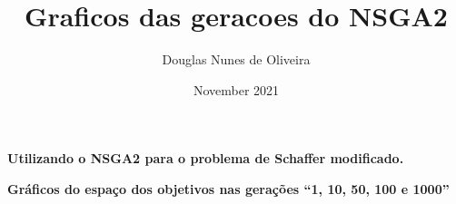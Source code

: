 \documentclass[11pt, a4paper]{report}
\title{Graficos das geracoes do NSGA2}
\author{Douglas Nunes de Oliveira}
\date{November 2021}
\begin{document}
    \begin{center}
        \textbf{Utilizando o NSGA2 para o problema de Schaffer modificado.}
        
        \textbf{Gráficos do espaço dos objetivos nas gerações ``1, 10, 50, 100 e 1000''}
        
        
    \end{center}
    

    
    \hrulefill
    

    \newpage

    
    \hrulefill
    
    
    \newpage
    
    \hrulefill
\end{document}
